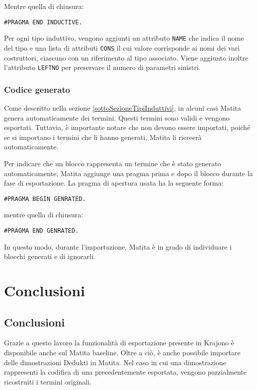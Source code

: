 \documentclass[12pt,a4paper]{mimosis}
\begin{document}
Mentre quella di chiusura:
\begin{center}
  \texttt{\#PRAGMA END INDUCTIVE.}
\end{center}

Per ogni tipo induttivo, vengono aggiunti un attributo \texttt{NAME} che indica 
il nome del tipo e una lista di attributi \texttt{CONS} il cui valore corrisponde
ai nomi dei vari costruttori, ciascuno con un riferimento al tipo associato.
Viene aggiunto inoltre l'attributo \texttt{LEFTNO} per preservare il numero di
parametri sinistri.

\subsection{Codice generato}
Come descritto nella sezione \ref{sottoSezioneTipiInduttivi}, in alcuni casi
Matita genera automaticamente dei termini. Questi termini sono validi e vengono
esportati. Tuttavia, è importante notare che non devono essere importati, poiché
se si importano i termini che li hanno generati, Matita li ricreerà automaticamente.

Per indicare che un blocco rappresenta un termine che è stato generato automaticamente,
Matita aggiunge una pragma prima e dopo il blocco durante la fase di esportazione.
La pragma di apertura usata ha la seguente forma:
\begin{center}
  \texttt{\#PRAGMA BEGIN GENRATED.}
\end{center}

mentre quella di chiusura:
\begin{center}
  \texttt{\#PRAGMA END GENRATED.}
\end{center}

In questo modo, durante l'importazione, Matita è in grado di individuare i
blocchi generati e di ignorarli.


\chapter{Conclusioni}
\section{Conclusioni}
Grazie a questo lavoro la funzionalità di esportazione presente in Krajono
è disponibile anche sul Matita baseline. Oltre a ciò, è anche possibile
importare delle dimostrazioni Dedukti in Matita. Nel caso in cui una dimostrazione
rappresenti la codifica di una precedentemente esportata, vengono parzialmente
ricostruiti i termini originali.
\end{document}

